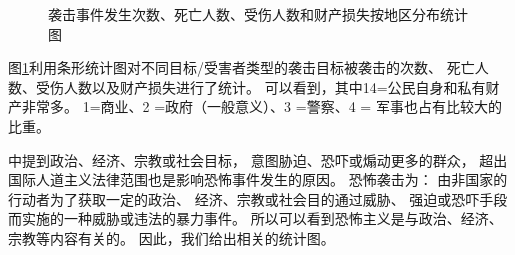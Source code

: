 \documentclass[bwprint]{gmcmthesis}
\begin{document}
\begin{figure}[htbp]
    \caption{袭击事件发生次数、死亡人数、受伤人数和财产损失按地区分布统计图}
    \label{tab:袭击目标分布}
\end{figure}

图\ref{tab:袭击目标分布}利用条形统计图对不同目标/受害者类型的袭击目标被袭击的次数、
死亡人数、受伤人数以及财产损失进行了统计。
可以看到，其中14=公民自身和私有财产非常多。
1=商业、2 =政府（一般意义）、3 =警察、4 = 军事也占有比较大的比重。


\cite{李国辉2014全球恐怖袭击时空演变及风险分析研究}
中提到政治、经济、宗教或社会目标，
意图胁迫、恐吓或煽动更多的群众，
超出国际人道主义法律范围也是影响恐怖事件发生的原因。
恐怖袭击为：
由非国家的行动者为了获取一定的政治、
经济、宗教或社会目的通过威胁、
强迫或恐吓手段而实施的一种威胁或违法的暴力事件。
所以可以看到恐怖主义是与政治、经济、宗教等内容有关的。
因此，我们给出相关的统计图。
\end{document}
